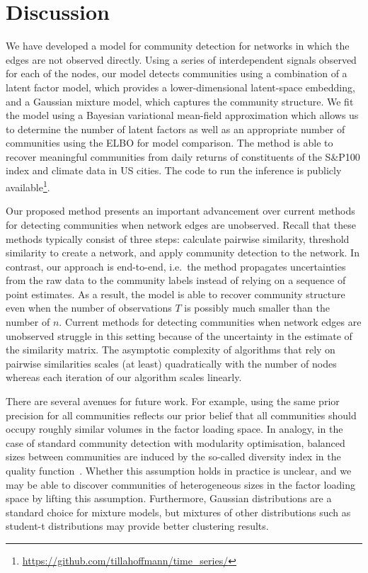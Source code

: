 \documentclass[onecolumn,pre,superscriptaddress, longbibliography, nofootinbib, notitlepage]{revtex4-1}
\begin{document}
\section{\label{sec:conclusion} Discussion}

We have developed a model for community detection for networks in which the edges are not observed directly. Using a series of interdependent signals observed for each of the nodes, our model detects communities using a combination of a latent factor model, which provides a lower-dimensional latent-space embedding, and a Gaussian mixture model, which captures the community structure. We fit the model using a Bayesian variational mean-field approximation which allows us to determine the number of latent factors as well as an appropriate number of communities using the ELBO for model comparison. The method is able to recover meaningful communities from daily returns of constituents of the S\&P100 index and climate data in US cities. The code to run the inference is publicly available\footnote{\url{https://github.com/tillahoffmann/time_series/}}.

Our proposed method presents an important advancement over current methods for detecting communities when network edges are unobserved. Recall that these methods typically consist of three steps: calculate pairwise similarity, threshold similarity to create a network, and apply community detection to the network. In contrast, our approach is end-to-end, i.e.\ the method propagates uncertainties from the raw data to the community labels instead of relying on a sequence of point estimates. As a result, the model is able to recover community structure even when the number of observations $T$ is possibly much smaller than the number of $n$. Current methods for detecting communities when network edges are unobserved struggle in this setting because of the uncertainty in the estimate of the similarity matrix. 
The asymptotic complexity of algorithms that rely on pairwise similarities scales (at least) quadratically with the number of nodes whereas each iteration of our algorithm scales linearly. 
 
There are several avenues for future work. For example, using the same prior precision for all communities reflects our prior belief that all communities should occupy roughly similar volumes in the factor loading space. In analogy, in the case of standard community detection with modularity optimisation, balanced sizes between communities are induced by the so-called diversity index in the quality function~\cite{Delvenne2010}. Whether this assumption holds in practice is unclear, and we may be able to discover communities of heterogeneous sizes in the factor loading space by lifting this assumption. Furthermore, Gaussian distributions are a standard choice for mixture models, but mixtures of other distributions such as student-t distributions may provide better clustering results.
\end{document}
